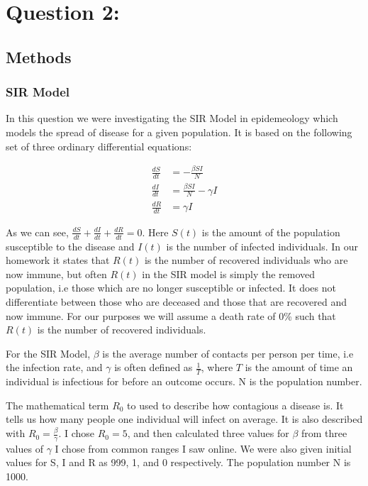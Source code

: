\documentclass[12pt]{article}
\begin{document}
\section{Question 2:}
\subsection{Methods}
\subsubsection{SIR Model}
In this question we were investigating the SIR Model in epidemeology which models the spread of disease for a given population. It is based on the following set of three ordinary differential equations:

\begin{align}
    \frac{dS}{dt} &= -\frac{\beta S I}{N} \\
    \frac{dI}{dt} &= \frac{\beta S I}{N} - \gamma I \\
    \frac{dR}{dt} &= \gamma I
\end{align}

As we can see, $\frac{dS}{dt} + \frac{dI}{dt} + \frac{dR}{dt} = 0$. Here $S(t)$ is the amount of the population susceptible to the disease and $I(t)$ is the number of infected individuals. In our homework it states that $R(t)$ is the number of recovered individuals who are now immune, but often $R(t)$ in the SIR model is simply the removed population, i.e those which are no longer susceptible or infected. It does not differentiate between those who are deceased and those that are recovered and now immune. For our purposes we will assume a death rate of 0\% such that $R(t)$ is the number of recovered individuals.

For the SIR Model, $\beta$ is the average number of contacts per person per time, i.e the infection rate, and $\gamma$ is often defined as $\frac{1}{T}$, where $T$ is the amount of time an individual is infectious for before an outcome occurs. N is the population number. 

The mathematical term $R_0$ to used to describe how contagious a disease is. It tells us how many people one individual will infect on average. It is also described with $R_0 = \frac{\beta}{\gamma}$. I chose $R_0 = 5$, and then calculated three values for $\beta$ from three values of $\gamma$ I chose from common ranges I saw online. We were also given initial values for S, I and R as 999, 1, and 0 respectively. The population number N is 1000.
\end{document}
